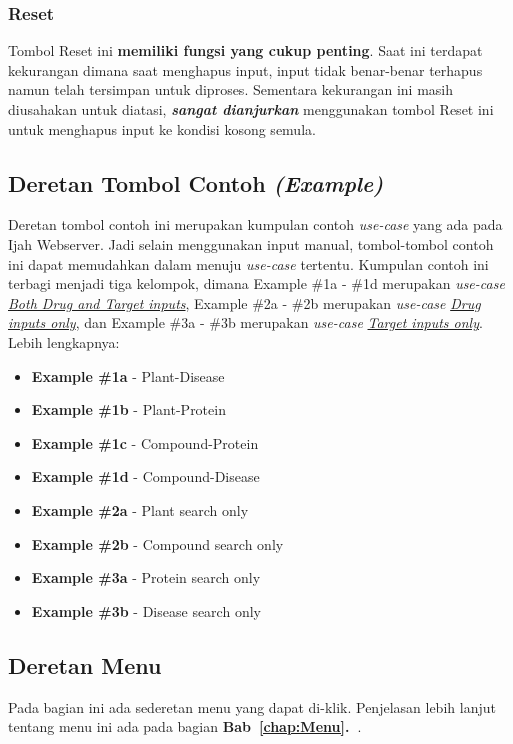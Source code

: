 		\subsubsection{Reset} \label{sssec:reset}
		Tombol Reset ini \textbf{memiliki fungsi yang cukup penting}. Saat ini terdapat kekurangan dimana saat menghapus input, input tidak benar-benar terhapus namun telah tersimpan untuk diproses. Sementara kekurangan ini masih diusahakan untuk diatasi, \textbf{\emph{sangat dianjurkan}} menggunakan tombol Reset ini untuk menghapus input ke kondisi kosong semula.

	\subsection{Deretan Tombol Contoh \emph{(Example)}} \label{ssec:example button}
	Deretan tombol contoh ini merupakan kumpulan contoh \emph{use-case} yang ada pada Ijah Webserver. Jadi selain menggunakan input manual, tombol-tombol contoh ini dapat memudahkan dalam menuju \emph{use-case} tertentu. Kumpulan contoh ini terbagi menjadi tiga kelompok, dimana Example \#1a - \#1d merupakan \emph{use-case} \hyperref[end to end]{\emph{Both Drug and Target inputs}}, Example \#2a - \#2b merupakan \emph{use-case} \hyperref[drug only]{\emph{Drug inputs only}}, dan Example \#3a - \#3b merupakan \emph{use-case} \hyperref[target only]{\emph{Target inputs only}}. Lebih lengkapnya:

	\begin{itemize}
	\item \textbf{Example \#1a} - Plant-Disease
	\item \textbf{Example \#1b} - Plant-Protein
	\item \textbf{Example \#1c} - Compound-Protein
	\item \textbf{Example \#1d} - Compound-Disease
	\item \textbf{Example \#2a} - Plant search only
	\item \textbf{Example \#2b} - Compound search only
	\item \textbf{Example \#3a} - Protein search only
	\item \textbf{Example \#3b} - Disease search only
	\end{itemize}

	\subsection{Deretan Menu} \label{ssec:menu list}
	Pada bagian ini ada sederetan menu yang dapat di-klik.
	Penjelasan lebih lanjut tentang menu ini ada pada bagian \textbf{Bab~\ref{chap:Menu}.~}.

